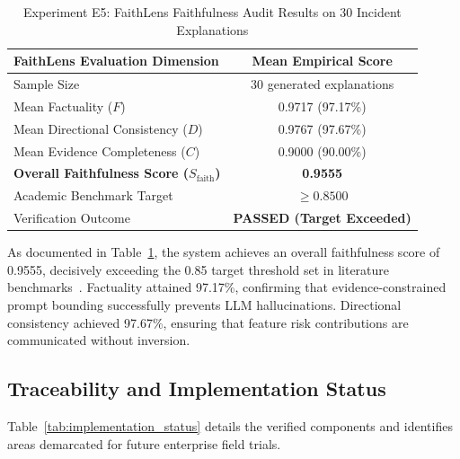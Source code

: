 \documentclass[conference]{IEEEtran}
\begin{document}
\begin{table}[htbp]
\caption{Experiment E5: FaithLens Faithfulness Audit Results on 30 Incident Explanations}
\label{tab:e5_results}
\centering
\begin{tabular}{lc}
\toprule
\textbf{FaithLens Evaluation Dimension} & \textbf{Mean Empirical Score} \\
\midrule
Sample Size & 30 generated explanations \\
Mean Factuality ($F$) & 0.9717 (97.17\%) \\
Mean Directional Consistency ($D$) & 0.9767 (97.67\%) \\
Mean Evidence Completeness ($C$) & 0.9000 (90.00\%) \\
\midrule
\textbf{Overall Faithfulness Score ($S_{\text{faith}}$)} & \textbf{0.9555} \\
Academic Benchmark Target & $\ge 0.8500$ \\
Verification Outcome & \textbf{PASSED (Target Exceeded)} \\
\bottomrule
\end{tabular}
\end{table}

As documented in Table~\ref{tab:e5_results}, the system achieves an overall faithfulness score of 0.9555, decisively exceeding the 0.85 target threshold set in literature benchmarks~\cite{si2024faithlens}. Factuality attained 97.17\%, confirming that evidence-constrained prompt bounding successfully prevents LLM hallucinations. Directional consistency achieved 97.67\%, ensuring that feature risk contributions are communicated without inversion.

\subsection{Traceability and Implementation Status}
\label{subsec:traceability}
Table~\ref{tab:implementation_status} details the verified components and identifies areas demarcated for future enterprise field trials.
\end{document}
